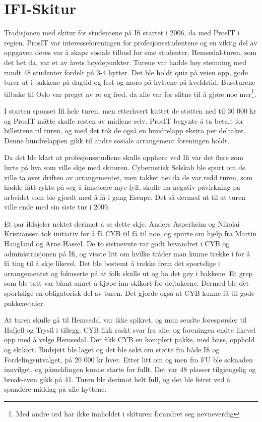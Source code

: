 \chapter{IFI-Skitur}

\author{Skrevet av Arne Hassel}

Tradisjonen med skitur for studentene på Ifi startet i 2006, da med ProsIT i regien. ProsIT var interesseforeningen for profesjonsstudentene og en viktig del av oppgaven deres var å skape sosiale tilbud for sine studenter. Hemsedal-turen, som det het da, var et av årets høydepunkter. Turene var hadde høy stemning med rundt 48 studenter fordelt på 3-4 hytter. Det ble holdt quiz på veien opp, gode turer ut i bakkene på dagtid og fest og moro på hyttene på kveldstid. Bussturene tilbake til Oslo var preget av ro og fred, da alle var for slitne til å gjøre noe mer\footnote{Med andre ord har ikke innholdet i skituren forandret seg nevneverdig}.

I starten sponset Ifi hele turen, men etterhvert kuttet de støtten ned til 30 000 kr og ProsIT måtte skaffe resten av midlene selv. ProsIT begynte å ta betalt for billettene til turen, og med det tok de også en hundrelapp ekstra per deltaker. Denne hundrelappen gikk til andre sosiale arrangement foreningen holdt.

Da det ble klart at profesjonsstudiene skulle opphøre ved Ifi var det flere som lurte på hva som ville skje med skituren. Cybernetisk Selskab ble spurt om de ville ta over driften av arrangementet, men takket nei da de var redd turen, som hadde fått rykte på seg å innebære mye fyll, skulle ha negativ påvirkning på arbeidet som ble gjordt med å få i gang Escape. Det så dermed ut til at turen ville ende med sin siste tur i 2009.

Et par ildsjeler nektet derimot å se dette skje. Anders Asperheim og Nikolai Kristiansen tok initiativ for å få CYB til få til noe, og spurte om hjelp fra Martin Haugland og Arne Hassel. De to sistnevnte var godt bevandret i CYB og administrasjonen på Ifi, og visste litt om hvilke tråder man kunne trekke i for å få ting til å skje likevel. Det ble bestemt å trekke frem det sportslige i arrangementet og fokuserte på at folk skulle ut og ha det gøy i bakkene. Et grep som ble tatt var blant annet å kjøpe inn skikort for deltakerne. Dermed ble det sportslige en obligatorisk del av turen. Det gjorde også at CYB kunne få til gode pakkeavtaler.

At turen skulle gå til Hemsedal var ikke spikret, og man sendte forespørsler til Hafjell og Trysil i tillegg. CYB fikk raskt svar fra alle, og foreningen endte likevel opp med å velge Hemsedal. Der fikk CYB en komplett pakke, med buss, opphold og skikort. Budsjett ble laget og det ble søkt om støtte fra både Ifi og Fordelingsutvalget, på 20 000 kr hver. Etter litt om og men fra FU ble søknaden innvilget, og påmeldingen kunne starte for fullt. Det var 48 plasser tilgjengelig og break-even gikk på 41. Turen ble derimot helt full, og det ble feiret ved å spandere middag på alle hyttene.


